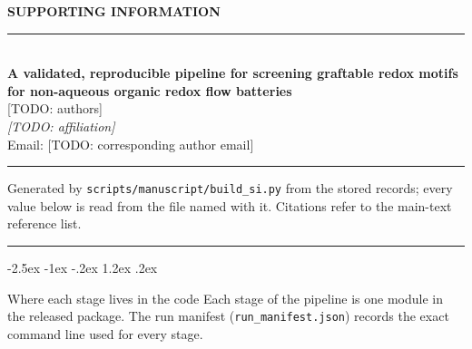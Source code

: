 \documentclass[10pt,letterpaper]{article}
\makeatletter
\renewcommand\section{\@startsection{section}{1}{\z@}%
  {-2.5ex \@plus -1ex \@minus -.2ex}%
  {1.2ex \@plus .2ex}%
  {\normalfont\large\bfseries\raggedright}}
\makeatother
\begin{document}
\thispagestyle{plain}

\begin{center}
{\sffamily\bfseries\large SUPPORTING INFORMATION}\\[6pt]
\rule{\textwidth}{0.8pt}\\[10pt]
{\Large\bfseries A validated, reproducible pipeline for screening graftable redox motifs for non-aqueous organic redox flow batteries}\\[10pt]
{\normalsize [TODO: authors]}\\[4pt]
{\small\itshape [TODO: affiliation]}\\[2pt]
{\small Email: [TODO: corresponding author email]}\\[8pt]
\rule{\textwidth}{0.4pt}
\end{center}

Generated by \texttt{scripts/\allowbreak{}manuscript/\allowbreak{}build\_\allowbreak{}si.\allowbreak{}py} from the stored records; every value below is read from the file named with it. Citations refer to the main-text reference list.

\tableofcontents
\vspace{6pt}
\noindent\rule{\textwidth}{0.4pt}

\section{Where each stage lives in the code}
Each stage of the pipeline is one module in the released package. The run manifest (\texttt{run\_\allowbreak{}manifest.\allowbreak{}json}) records the exact command line used for every stage.
\end{document}
